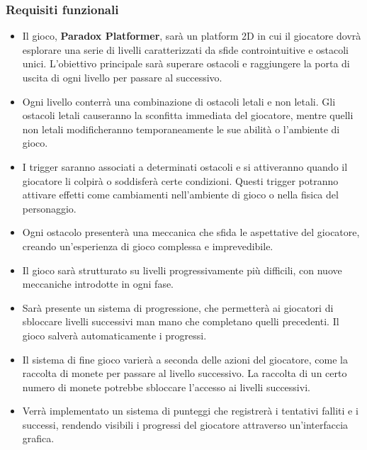 \documentclass[a4paper,12pt]{report}
\begin{document}
	\subsubsection{Requisiti funzionali}
	\begin{itemize}
		\item Il gioco, \textbf{Paradox Platformer}, sarà un platform 2D in cui il giocatore dovrà esplorare una serie di livelli caratterizzati da sfide controintuitive e ostacoli unici. L’obiettivo principale sarà superare ostacoli e raggiungere la porta di uscita di ogni livello per passare al successivo.
		\item Ogni livello conterrà una combinazione di ostacoli letali e non letali. Gli ostacoli letali causeranno la sconfitta immediata del giocatore, mentre quelli non letali modificheranno temporaneamente le sue abilità o l’ambiente di gioco.
		\item I trigger saranno associati a determinati ostacoli e si attiveranno quando il giocatore li colpirà o soddisferà certe condizioni. Questi trigger potranno attivare effetti come cambiamenti nell’ambiente di gioco o nella fisica del personaggio.
		\item Ogni ostacolo presenterà una meccanica che sfida le aspettative del giocatore, creando un’esperienza di gioco complessa e imprevedibile.
		\item Il gioco sarà strutturato su livelli progressivamente più difficili, con nuove meccaniche introdotte in ogni fase.
		\item Sarà presente un sistema di progressione, che permetterà ai giocatori di sbloccare livelli successivi man mano che completano quelli precedenti. Il gioco salverà automaticamente i progressi.
		\item Il sistema di fine gioco varierà a seconda delle azioni del giocatore, come la raccolta di monete per passare al livello successivo. La raccolta di un certo numero di monete potrebbe sbloccare l'accesso ai livelli successivi.
		\item Verrà implementato un sistema di punteggi che registrerà i tentativi falliti e i successi, rendendo visibili i progressi del giocatore attraverso un’interfaccia grafica.
	\end{itemize}
	
\end{document}
